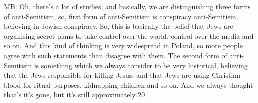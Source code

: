 MB: Oh, there’s a lot of studies, and basically, we are distinguishing three forms of anti-Semitism, so, first form of anti-Semitism is conspiracy anti-Semitism, believing in Jewish conspiracy. So, this is basically the belief that Jews are organising secret plans to take control over the world, control over the media and so on. And this kind of thinking is very widespread in Poland, so more people agree with such statements than disagree with them. The second form of anti-Semitism is something which we always consider to be very historical, believing that the Jews responsible for killing Jesus, and that Jews are using Christian blood for ritual purposes, kidnapping children and so on. And we always thought that’s it’s gone, but it’s still approximately 20%

